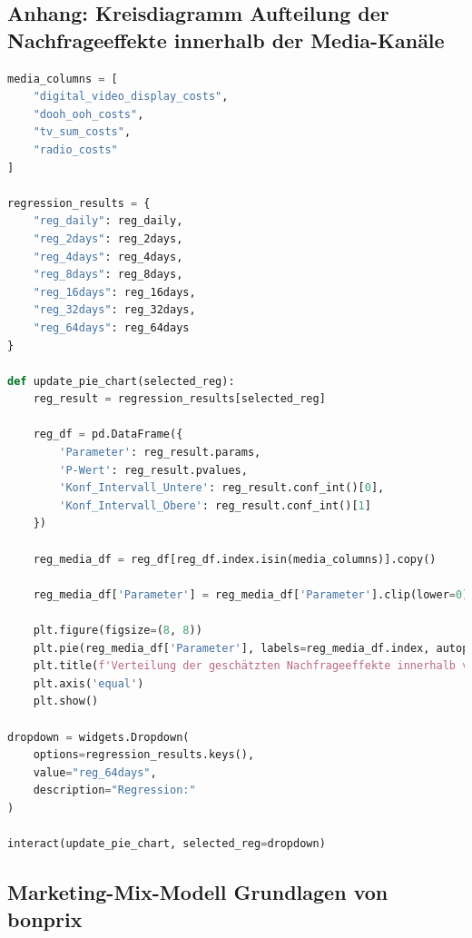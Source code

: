\documentclass{common/nak}
\numberwithin{equation}{subsection}
\begin{document}
\subsection*{Anhang: Kreisdiagramm Aufteilung der Nachfrageeffekte innerhalb der Media-Kanäle}
\label{AufteilungDerNachfrageeffekt}
\begin{lstlisting}[language=Python, linewidth=\textwidth]
media_columns = [
    "digital_video_display_costs", 
    "dooh_ooh_costs", 
    "tv_sum_costs",
    "radio_costs"
]

regression_results = {
    "reg_daily": reg_daily,
    "reg_2days": reg_2days,
    "reg_4days": reg_4days,
    "reg_8days": reg_8days,
    "reg_16days": reg_16days,
    "reg_32days": reg_32days,
    "reg_64days": reg_64days
}

def update_pie_chart(selected_reg):
    reg_result = regression_results[selected_reg]
    
    reg_df = pd.DataFrame({
        'Parameter': reg_result.params,
        'P-Wert': reg_result.pvalues,
        'Konf_Intervall_Untere': reg_result.conf_int()[0],
        'Konf_Intervall_Obere': reg_result.conf_int()[1]
    })
    
    reg_media_df = reg_df[reg_df.index.isin(media_columns)].copy()
    
    reg_media_df['Parameter'] = reg_media_df['Parameter'].clip(lower=0)
    
    plt.figure(figsize=(8, 8))
    plt.pie(reg_media_df['Parameter'], labels=reg_media_df.index, autopct='%1.1f%%', startangle=140)
    plt.title(f'Verteilung der geschätzten Nachfrageeffekte innerhalb von Media-Kanäle in {selected_reg} ')
    plt.axis('equal') 
    plt.show()

dropdown = widgets.Dropdown(
    options=regression_results.keys(),
    value="reg_64days",  
    description="Regression:"
)

interact(update_pie_chart, selected_reg=dropdown)
\end{lstlisting}
\subsection*{Marketing-Mix-Modell Grundlagen von bonprix}
\label{Marketing-Mix-ModellGrundlagenVonBonprix}
\centering

\newpage
\end{document}
